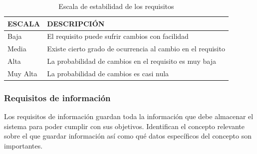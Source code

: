 \begin{table}[htpb]
\centering
\begin{tabularx}{\textwidth}{|l|X|}
\hline
ESCALA   & DESCRIPCIÓN                                                 \\ \hline
Baja     & El requisito puede sufrir cambios con facilidad             \\ \hline
Media    & Existe cierto grado de ocurrencia al cambio en el requisito \\ \hline
Alta     & La probabilidad de cambios en el requisito es muy baja      \\ \hline
Muy Alta & La probabilidad de cambios es casi nula                     \\ \hline
\end{tabularx}
\caption{Escala de estabilidad de los requisitos}
\label{esc_estab}
\end{table}


\subsubsection{Requisitos de información}


Los requisitos de información guardan toda la información que debe almacenar el sistema para poder cumplir con sus objetivos. Identifican el concepto relevante sobre el que guardar información así como qué datos específicos del concepto son importantes.


